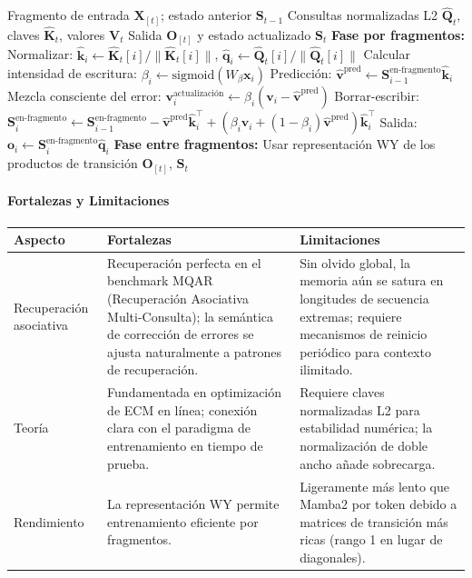 \begin{algorithm}[H]
\caption{Actualización de Estado de DeltaNet con Representación WY}
\begin{algorithmic}[1]
\Require Fragmento de entrada $\mathbf{X}_{[t]}$; estado anterior $\mathbf{S}_{t-1}$
\Require Consultas normalizadas L2 $\hat{\mathbf{Q}}_t$, claves $\hat{\mathbf{K}}_t$, valores $\mathbf{V}_t$
\Ensure Salida $\mathbf{O}_{[t]}$ y estado actualizado $\mathbf{S}_t$
\State \textbf{Fase por fragmentos:}
    \State Normalizar: $\hat{\mathbf{k}}_i \gets \hat{\mathbf{K}}_t[i] / \|\hat{\mathbf{K}}_t[i]\|$, $\hat{\mathbf{q}}_i \gets \hat{\mathbf{Q}}_t[i] / \|\hat{\mathbf{Q}}_t[i]\|$
    \State Calcular intensidad de escritura: $\beta_i \gets \text{sigmoid}(W_\beta \mathbf{x}_i)$
    \State Predicción: $\hat{\mathbf{v}}^\text{pred} \gets \mathbf{S}_{i-1}^\text{en-fragmento} \hat{\mathbf{k}}_i$
    \State Mezcla consciente del error: $\mathbf{v}_i^\text{actualización} \gets \beta_i(\mathbf{v}_i - \hat{\mathbf{v}}^\text{pred})$
    \State Borrar-escribir: $\mathbf{S}_i^\text{en-fragmento} \gets \mathbf{S}_{i-1}^\text{en-fragmento} - \hat{\mathbf{v}}^\text{pred}\hat{\mathbf{k}}_i^\top + (\beta_i \mathbf{v}_i + (1-\beta_i)\hat{\mathbf{v}}^\text{pred})\hat{\mathbf{k}}_i^\top$
    \State Salida: $\mathbf{o}_i \gets \mathbf{S}_i^\text{en-fragmento} \hat{\mathbf{q}}_i$
\EndFor
\State \textbf{Fase entre fragmentos:} Usar representación WY de los productos de transición
\Return $\mathbf{O}_{[t]}$, $\mathbf{S}_{t}$
\end{algorithmic}
\end{algorithm}

\paragraph{Fortalezas y Limitaciones}

\begin{table}[H]
\centering
\small
\begin{tabularx}{0.95\linewidth}{Xp{4cm}p{4cm}}
\toprule
\textbf{Aspecto} & \textbf{Fortalezas} & \textbf{Limitaciones} \\
\midrule
Recuperación asociativa & Recuperación perfecta en el benchmark MQAR (Recuperación Asociativa Multi-Consulta); la semántica de corrección de errores se ajusta naturalmente a patrones de recuperación. & Sin olvido global, la memoria aún se satura en longitudes de secuencia extremas; requiere mecanismos de reinicio periódico para contexto ilimitado. \\
Teoría & Fundamentada en optimización de ECM en línea; conexión clara con el paradigma de entrenamiento en tiempo de prueba. & Requiere claves normalizadas L2 para estabilidad numérica; la normalización de doble ancho añade sobrecarga. \\
Rendimiento & La representación WY permite entrenamiento eficiente por fragmentos. & Ligeramente más lento que Mamba2 por token debido a matrices de transición más ricas (rango 1 en lugar de diagonales). \\
\bottomrule
\end{tabularx}
\end{table}

